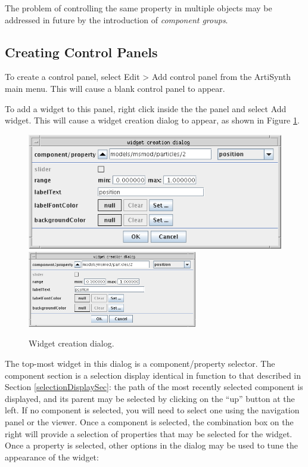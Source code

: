 \documentclass{article}
\begin{document}
\begin{sideblock}
The problem of controlling the same property in multiple objects
may be addressed in future by the introduction of {\it component groups}.
\end{sideblock}

\subsection{Creating Control Panels}

To create a control panel, select {\sf Edit > Add control panel} from the
ArtiSynth main menu. This will cause a blank control panel to appear.

To add a widget to this panel, right click inside the the panel and select
{\sf Add widget}. This will cause a widget creation dialog to appear,
as shown in Figure \ref{widgetCreationDialogFig}.

\begin{figure}
\begin{center}
\iflatexml
\includegraphics[]{images/widgetDialog}
\else
\includegraphics[width=0.66\textwidth]{images/widgetDialog}
\fi
\end{center}
\caption{Widget creation dialog.}%
\label{widgetCreationDialogFig}
\end{figure}

The top-most widget in this dialog is a component/property
selector. The component section is a selection display identical in
function to that described in Section \ref{selectionDisplaySec}: the path of the
most recently selected component is displayed, and its parent may be
selected by clicking on the ``up'' button at the left. If no component
is selected, you will need to select one using the navigation panel or
the viewer.  Once a component is selected, the combination box on the
right will provide a selection of properties that may be selected for
the widget. Once a property is selected, other options in the dialog
may be used to tune the appearance of the widget:
\end{document}
